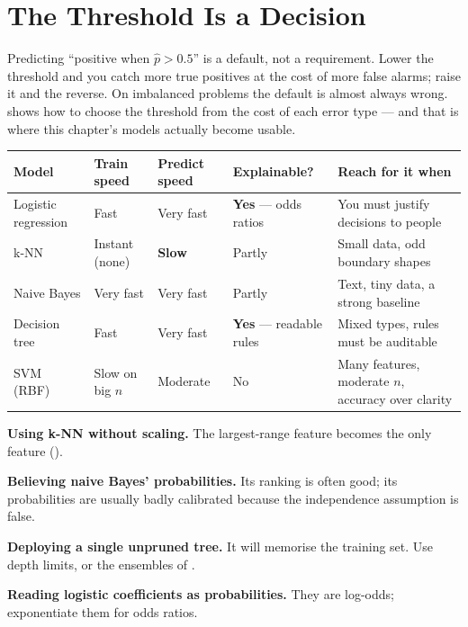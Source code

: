 \section{The Threshold Is a Decision}

\begin{alertbox}
Predicting ``positive when $\hat{p} > 0.5$'' is a default, not a requirement.
Lower the threshold and you catch more true positives at the cost of more false
alarms; raise it and the reverse. On imbalanced problems the default is almost
always wrong.  shows how to choose the threshold from the cost
of each error type --- and that is where this chapter's models actually become
usable.
\end{alertbox}

\begin{longtable}{@{}L{2.7cm}L{2.4cm}L{2.4cm}L{2.5cm}L{4.0cm}@{}}
\toprule
{}
\textbf{Model} & \textbf{Train speed} & \textbf{Predict speed} & \textbf{Explainable?} & \textbf{Reach for it when} \\
\midrule
\endhead
Logistic regression & Fast & Very fast & \textbf{Yes} --- odds ratios & You must justify decisions to people \\
k-NN & Instant (none) & \textbf{Slow} & Partly & Small data, odd boundary shapes \\
Naive Bayes & Very fast & Very fast & Partly & Text, tiny data, a strong baseline \\
Decision tree & Fast & Very fast & \textbf{Yes} --- readable rules & Mixed types, rules must be auditable \\
SVM (RBF) & Slow on big $n$ & Moderate & No & Many features, moderate $n$, accuracy over clarity \\
\bottomrule
\end{longtable}

\begin{pitfall}
\begin{tight}
  \item \textbf{Using k-NN without scaling.} The largest-range feature becomes the
        only feature ().
  \item \textbf{Believing naive Bayes' probabilities.} Its ranking is often good;
        its probabilities are usually badly calibrated because the independence
        assumption is false.
  \item \textbf{Deploying a single unpruned tree.} It will memorise the training
        set. Use depth limits, or the ensembles of .
  \item \textbf{Reading logistic coefficients as probabilities.} They are
        log-odds; exponentiate them for odds ratios.
\end{tight}
\end{pitfall}

